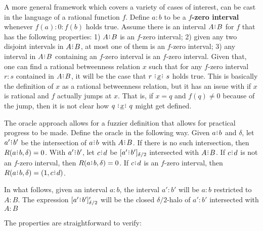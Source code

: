 \documentclass[12pt]{article}
\begin{document}
A more general framework which covers a variety of cases of interest, can be cast in the language of a rational function $f$. Define $a:b$ to be a \textbf{$f$-zero interval} whenever $f(a):0:f(b)$ holds true. Assume there is an interval $A \rint B$ for $f$ that has the following properties: 1) $A \rint B$ is an $f$-zero interval; 2) given any two disjoint intervals in $A \rint B$, at most one of them is an $f$-zero interval; 3) any interval in $A \rint B$ containing an $f$-zero interval is an $f$-zero interval. Given that, one can find a rational betweenness relation $x$ such that for any $f$-zero interval $r:s$ contained in $A \rint B$, it will be the case that $r \xrel s$ holds true. This is basically the definition of $x$ as a rational betweenness relation, but it has an issue with if $x$ is rational and $f$ actually jumps at $x$. That is, if $x=q$ and $f(q) \neq 0$ because of the jump, then it is not clear how $q \xrel q$ might get defined. 

The oracle approach allows for a fuzzier definition that allows for practical progress to be made. Define the oracle in the following way. Given $a \rint b$ and $\delta$, let $a' \rint b'$ be the intersection of $a\rint b$ with $A \rint B$. If there is no such intersection, then $R(a \rint b, \delta) = 0$. With $a' \rint b'$, let $c \rint d$ be $\clhalo[\delta/2]{a' \rint b'}$ intersected with $A \rint B$. If $c \rint d$ is not an $f$-zero interval, then $R(a \rint b, \delta) = 0$. If $c \rint d$ is an $f$-zero interval, then $R(a \rint b, \delta) = (1, c \rint d)$.

In what follows, given an interval $a:b$, the interval $a':b'$ will be $a:b$ restricted to $A:B$. The expression $\clhalo[\delta/2]{a' \rint b'}'$ will be the closed $\delta/2$-halo of $a':b'$ intersected with $A:B$

The properties are straightforward to verify:
\end{document}
